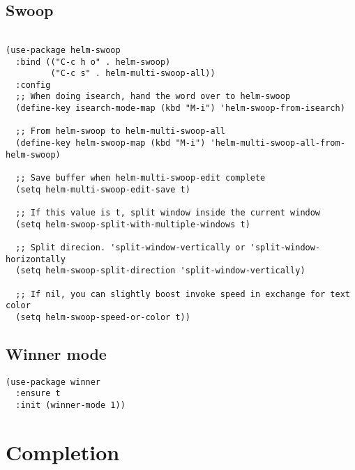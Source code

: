\documentclass[12pt]{article}
\begin{document}
\subsection{Swoop}
\label{sec:orgdac3f42}
\begin{verbatim}

(use-package helm-swoop
  :bind (("C-c h o" . helm-swoop)
         ("C-c s" . helm-multi-swoop-all))
  :config
  ;; When doing isearch, hand the word over to helm-swoop
  (define-key isearch-mode-map (kbd "M-i") 'helm-swoop-from-isearch)

  ;; From helm-swoop to helm-multi-swoop-all
  (define-key helm-swoop-map (kbd "M-i") 'helm-multi-swoop-all-from-helm-swoop)

  ;; Save buffer when helm-multi-swoop-edit complete
  (setq helm-multi-swoop-edit-save t)

  ;; If this value is t, split window inside the current window
  (setq helm-swoop-split-with-multiple-windows t)

  ;; Split direcion. 'split-window-vertically or 'split-window-horizontally
  (setq helm-swoop-split-direction 'split-window-vertically)

  ;; If nil, you can slightly boost invoke speed in exchange for text color
  (setq helm-swoop-speed-or-color t))

\end{verbatim}

\subsection{Winner mode}
\label{sec:org057ae62}

\begin{verbatim}
(use-package winner
  :ensure t
  :init (winner-mode 1))
\end{verbatim}

\section{Completion}
\label{sec:org6d8fe5c}
\end{document}
